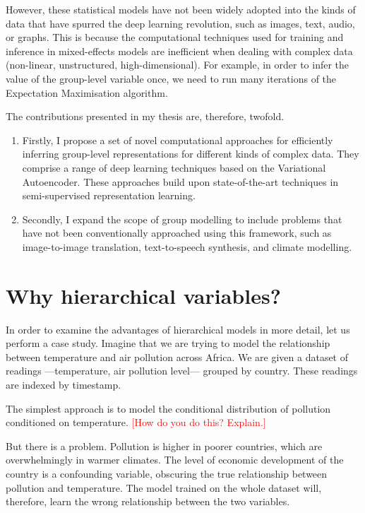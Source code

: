 \documentclass[backrefs]{cam-thesis}
\newcommand{\crit}[1]{\textcolor{red}{#1}}
\begin{document}
However, these statistical models have not been widely adopted into the kinds of data that have spurred the deep learning revolution, such as images, text, audio, or graphs. This is because the computational techniques used for training and inference in mixed-effects models are inefficient when dealing with complex data (non-linear, unstructured, high-dimensional). For example, in order to infer the value of the group-level variable once, we need to run many iterations of the Expectation Maximisation algorithm.

The contributions presented in my thesis are, therefore, twofold. 
\begin{enumerate}
    \item Firstly, I propose a set of novel computational approaches for efficiently inferring group-level representations for different kinds of complex data. They comprise a range of deep learning techniques based on the Variational Autoencoder. These approaches build upon state-of-the-art techniques in semi-supervised representation learning.
    \item Secondly, I expand the scope of group modelling to include problems that have not been conventionally approached using this framework, such as image-to-image translation, text-to-speech synthesis, and climate modelling.
\end{enumerate}

\section{Why hierarchical variables?}

In order to examine the advantages of hierarchical models in more detail, let us perform a case study. Imagine that we are trying to model the relationship between temperature and air pollution across Africa. We are given a dataset of readings ---temperature, air pollution level--- grouped by country. These readings are indexed by timestamp.

The simplest approach is to model the conditional distribution of pollution conditioned on temperature. \crit{[How do you do this? Explain.]}

But there is a problem. Pollution is higher in poorer countries, which are overwhelmingly in warmer climates. The level of economic development of the country is a confounding variable, obscuring the true relationship between pollution and temperature. The model trained on the whole dataset will, therefore, learn the wrong relationship between the two variables.
\end{document}
